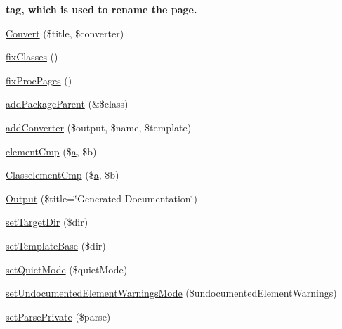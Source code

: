 \begin{Indent}{\bf tag, which is used to rename the page.}
\begin{DoxyCompactItemize}
\item 
\hyperlink{classphp_documentor___intermediate_parser_a37f8a580494f3b63d9ac6811fdda3d1e}{\-Convert} (\$title, \$converter)
\item 
\hyperlink{classphp_documentor___intermediate_parser_ae6d77de15c05ae0e233660d104450154}{fix\-Classes} ()
\item 
\hyperlink{classphp_documentor___intermediate_parser_a3098d457ee2009cf8cc416c183b26284}{fix\-Proc\-Pages} ()
\item 
\hyperlink{classphp_documentor___intermediate_parser_a116e673ec85d5b940b6f61aba5ffd307}{add\-Package\-Parent} (\&\$class)
\item 
\hyperlink{classphp_documentor___intermediate_parser_af3c436d15adbf6d92dfdc75633775be7}{add\-Converter} (\$output, \$name, \$template)
\item 
\hyperlink{classphp_documentor___intermediate_parser_ab68c29852d8512dce6e543479b51e24a}{element\-Cmp} (\$\hyperlink{classa}{a}, \$b)
\item 
\hyperlink{classphp_documentor___intermediate_parser_a951a61edd89ea0d6494a082d90b3566f}{\-Classelement\-Cmp} (\$\hyperlink{classa}{a}, \$b)
\item 
\hyperlink{classphp_documentor___intermediate_parser_ab3487c5cde27ed9e93dc457c6ad0f4ef}{\-Output} (\$title=\char`\"{}\-Generated \-Documentation\char`\"{})
\item 
\hyperlink{classphp_documentor___intermediate_parser_a07611111094b2954729773f6436a0fe1}{set\-Target\-Dir} (\$dir)
\item 
\hyperlink{classphp_documentor___intermediate_parser_a97d9600189aa312e697768b0e5d3656f}{set\-Template\-Base} (\$dir)
\item 
\hyperlink{classphp_documentor___intermediate_parser_ad9d77a99fb9fffe2c0e593975eca6a69}{set\-Quiet\-Mode} (\$quiet\-Mode)
\item 
\hyperlink{classphp_documentor___intermediate_parser_aa5dcce4907fdc02d926acfa7afa7621b}{set\-Undocumented\-Element\-Warnings\-Mode} (\$undocumented\-Element\-Warnings)
\item 
\hyperlink{classphp_documentor___intermediate_parser_acf68c83b31655d7d037b298d17eab48f}{set\-Parse\-Private} (\$parse)
\end{DoxyCompactItemize}
\end{Indent}
